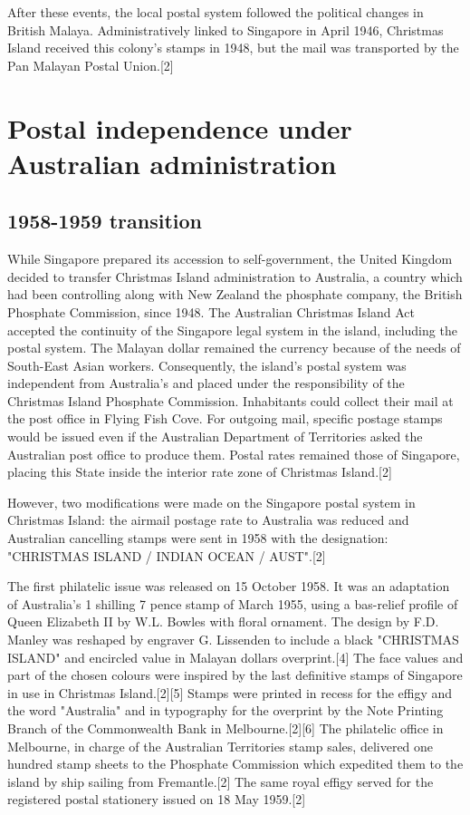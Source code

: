 After these events, the local postal system followed the political
changes in British Malaya. Administratively linked to Singapore in
April 1946, Christmas Island received this colony's stamps in 1948,
but the mail was transported by the Pan Malayan Postal Union.[2]

\section{Postal independence under Australian administration}

\subsection{1958-1959 transition}

While Singapore prepared its accession to self-government,
the United Kingdom decided to transfer Christmas Island administration
to Australia, a country which had been controlling along with New Zealand
the phosphate company, the British Phosphate Commission, 
since 1948. The Australian Christmas Island Act accepted 
the continuity of the Singapore legal system in the island, 
including the postal system. The Malayan dollar remained 
the currency because of the needs of South-East Asian workers. 
Consequently, the island's postal system was independent 
from Australia's and placed under the responsibility of the 
Christmas Island Phosphate Commission. Inhabitants could 
collect their mail at the post office in Flying Fish Cove. For outgoing mail, specific postage stamps would be issued even if the Australian Department of Territories asked the Australian post office to produce them. Postal rates remained those of Singapore, placing this State inside the interior rate zone of Christmas Island.[2]

However, two modifications were made on the Singapore postal system in Christmas Island: the airmail postage rate to Australia was reduced and Australian cancelling stamps were sent in 1958 with the designation: "CHRISTMAS ISLAND / INDIAN OCEAN / AUST".[2]

The first philatelic issue was released on 15 October 1958. It was an adaptation of Australia's 1 shilling 7 pence stamp of March 1955, using a bas-relief profile of Queen Elizabeth II by W.L. Bowles with floral ornament. The design by F.D. Manley was reshaped by engraver G. Lissenden to include a black "CHRISTMAS ISLAND" and encircled value in Malayan dollars overprint.[4] The face values and part of the chosen colours were inspired by the last definitive stamps of Singapore in use in Christmas Island.[2][5] Stamps were printed in recess for the effigy and the word "Australia" and in typography for the overprint by the Note Printing Branch of the Commonwealth Bank in Melbourne.[2][6] The philatelic office in Melbourne, in charge of the Australian Territories stamp sales, delivered one hundred stamp sheets to the Phosphate Commission which expedited them to the island by ship sailing from Fremantle.[2] The same royal effigy served for the registered postal stationery issued on 18 May 1959.[2]


